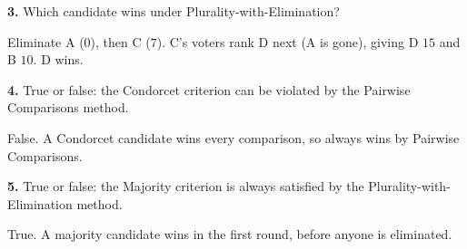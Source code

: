 \documentclass[12pt]{ximera}
\begin{document}
\begin{problem}
\begin{prompt}
\textbf{3.} Which candidate wins under Plurality-with-Elimination?

\begin{multipleChoice}
\end{multipleChoice}

\begin{feedback}
Eliminate A ($0$), then C ($7$). C's voters rank D next (A is gone), giving D $15$ and
B $10$. D wins.
\end{feedback}
\end{prompt}
\end{problem}

\begin{problem}
\begin{prompt}
\textbf{4.} True or false: the Condorcet criterion can be violated by the Pairwise
Comparisons method.

\begin{multipleChoice}
\end{multipleChoice}

\begin{feedback}
False. A Condorcet candidate wins every comparison, so always wins by Pairwise
Comparisons.
\end{feedback}
\end{prompt}

\begin{prompt}
\textbf{5.} True or false: the Majority criterion is always satisfied by the
Plurality-with-Elimination method.

\begin{multipleChoice}
\end{multipleChoice}

\begin{feedback}
True. A majority candidate wins in the first round, before anyone is eliminated.
\end{feedback}
\end{prompt}
\end{problem}
\end{document}
